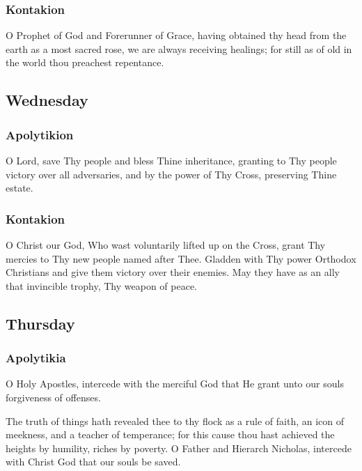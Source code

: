 \subsubsection{Kontakion}

 O Prophet of God and Forerunner of Grace, having obtained thy head from the earth as a most sacred rose, we are always receiving healings; for still as of old in the world thou preachest repentance. 

\subsection{Wednesday}

\subsubsection{Apolytikion}

 O Lord, save Thy people and bless Thine inheritance, granting to Thy people victory over all adversaries, and by the power of Thy Cross, preserving Thine estate.

\subsubsection{Kontakion}

 O Christ our God, Who wast voluntarily lifted up on the Cross, grant Thy mercies to Thy new people named after Thee. Gladden with Thy power Orthodox Christians and give them victory over their enemies. May they have as an ally that invincible trophy, Thy weapon of peace.

\subsection{Thursday}

\subsubsection{Apolytikia}

 O Holy Apostles, intercede with the merciful God that He grant unto our souls forgiveness of offenses.

 The truth of things hath revealed thee to thy flock as a rule of faith, an icon of meekness, and a teacher of temperance; for this cause thou hast achieved the heights by humility, riches by poverty. O Father and Hierarch Nicholas, intercede with Christ God that our souls be saved.

